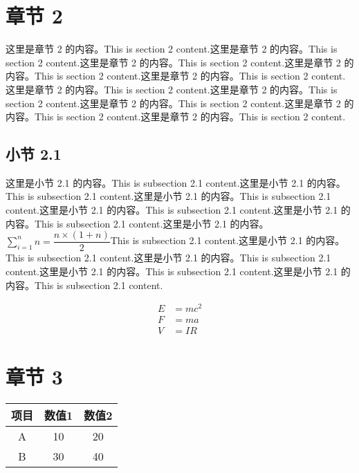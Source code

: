 \documentclass[UTF8]{article}
\begin{document}
  \section{章节 2}

  这里是章节 2 的内容。This is section 2 content.这里是章节 2 的内容。This is section 2 content.这里是章节 2 的内容。This is section 2 content.这里是章节 2 的内容。This is section 2 content.这里是章节 2 的内容。This is section 2 content.这里是章节 2 的内容。This is section 2 content.这里是章节 2 的内容。This is section 2 content.这里是章节 2 的内容。This is section 2 content.这里是章节 2 的内容。This is section 2 content.这里是章节 2 的内容。This is section 2 content.\cite{test2}

    \subsection{小节 2.1}

      这里是小节 2.1 的内容。This is subsection 2.1 content.这里是小节 2.1 的内容。This is subsection 2.1 content.这里是小节 2.1 的内容。This is subsection 2.1 content.这里是小节 2.1 的内容。This is subsection 2.1 content.这里是小节 2.1 的内容。This is subsection 2.1 content.这里是小节 2.1 的内容。$\sum_{i=1}^{n}n = \dfrac{n \times \left(1 + n\right)}{2}$This is subsection 2.1 content.这里是小节 2.1 的内容。This is subsection 2.1 content.这里是小节 2.1 的内容。This is subsection 2.1 content.这里是小节 2.1 的内容。This is subsection 2.1 content.这里是小节 2.1 的内容。This is subsection 2.1 content.\cite{test1}

      $$
        \begin{aligned}
          E & = mc^2 \\
          F & = ma \\
          V & = IR
        \end{aligned}
      $$

  \newpage
  \section{章节 3}

  \begin{figure}[htbp]
    \centering
    \label{fig:example}
  \end{figure}

  \begin{table}[htbp]
    \centering
    \begin{tabular}{ccc}
      \toprule
      项目 & 数值1 & 数值2 \\
      \midrule
      A & 10 & 20 \\
      B & 30 & 40 \\
      \bottomrule
    \end{tabular}
    \label{tab:example}
  \end{table}
\end{document}
